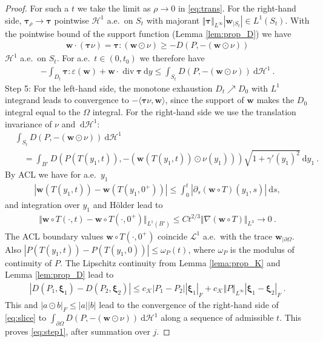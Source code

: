 \documentclass[10pt,a4paper]{amsart}
\newcommand{\K}{\mathcal{K}}
\newcommand{\bftau}{\boldsymbol{\tau}}
\newcommand{\bfw}{\boldsymbol{w}}
\newcommand{\bfxi}{\boldsymbol{\xi}}
\newcommand{\dd}{\:\mathrm{d}}
\renewcommand\div{\operatorname{\mathrm{div}}}
\begin{document}
\begin{proof}
    For such a $t$ we take the limit as $\rho \rightarrow 0$ in \eqref{eq:trans}.
    For the right-hand side, $\bftau_\rho \rightarrow \bftau$ pointwise $\mathcal{H}^1$ a.e.\ on $S_t$ with majorant $\Vert \bftau\Vert_{L^\infty}|\bfw_{|S_t}| \in L^1(S_t)$.
    With the pointwise bound of the support function (Lemma \ref{lem:prop_D}) we have
    \begin{align*}
        \bfw \cdot (\bftau\nu) = \bftau : (\bfw\odot \nu) \geq - D(P, -(\bfw\odot \nu))
    \end{align*}
    $\mathcal{H}^1$ a.e.\ on $S_t$. For a.e.\ $t\in(0,t_0)$ we therefore have
    \begin{align}
        -\int_{D_t} \bftau : \varepsilon(\bfw) + \bfw\cdot\div\bftau \dd y
        \leq \int_{S_t} D(P, -(\bfw\odot \nu)) \dd \mathcal{H}^1 \ . \label{eq:slice}
    \end{align}
    Step 5:
    For the left-hand side, the monotone exhaustion $D_t \nearrow D_0$ with
    $L^1$ integrand leads to convergence to $-\langle \bftau\nu, \bfw\rangle$, since
    the support of $\bfw$ makes the $D_0$ integral equal to the $\Omega$ integral.
    For the right-hand side we use the translation invariance of $\nu$ and $\dd \mathcal{H}^1$:
    \begin{align*}
        &\int_{S_t} D(P, -(\bfw\odot \nu)) \dd \mathcal{H}^1\\
        &\quad=\int_{B'} D(P(T(y_1,t)), -(\bfw (T(y_1,t))\odot \nu(y_1))) \sqrt{1+\gamma'(y_1)^2} \dd y_1 \ .
    \end{align*}
    By ACL we have for a.e.\ $y_1$
    \begin{align*}
        |\bfw (T(y_1,t)) - \bfw (T(y_1,0^+))| \leq \int_{0}^{t} |\partial_s(\bfw\circ T)(y_1,s)| \dd s,
    \end{align*}
    and integration over $y_1$ and H\"older lead to
    \begin{align*}
        \Vert \bfw \circ T(\cdot, t) - \bfw \circ T(\cdot, 0^+)\Vert_{L^1(B')}
        \leq  C t^{2/3} \Vert \nabla(\bfw \circ T)\Vert_{L^3} \rightarrow 0 \ .
    \end{align*}
    The ACL boundary values $\bfw \circ T(\cdot, 0^{+})$ coincide $\mathcal{L}^{1}$ a.e.\ with the trace $\bfw_{|\partial\Omega}$.
    Also $|P(T(y_1,t))-P(T(y_1,0))| \leq \omega_P(t)$, where $\omega_P$ is the modulus of continuity of $P$.
    The Lipschitz continuity from Lemma \ref{lema:prop_K} and Lemma \ref{lem:prop_D} lead to
    \begin{align*}
        |D(P_1,\bfxi_1) - D(P_2,\bfxi_2)| \leq c_\K |P_1-P_2| |\bfxi_1|_F + c_\K \Vert P\Vert_{L^\infty}
        |\bfxi_1-\bfxi_2|_F \ .
    \end{align*}
    This and $|a\odot b|_F \leq |a||b|$ lead to the convergence of the right-hand side of \eqref{eq:slice}
    to $\int_{\partial\Omega} D(P,-(\bfw\odot \nu)) \dd \mathcal{H}^1$ along a sequence of admissible $t$. This proves \eqref{eq:step1}, after summation over $j$.


\end{proof}
\end{document}
